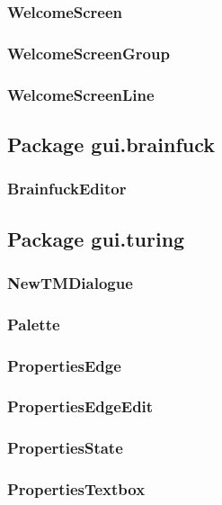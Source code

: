 \documentclass[%
  a4paper,%
  11pt,%
  blue,%
  hyperref	%
  ]{tubsartcl}
\begin{document}
\subsubsection{WelcomeScreen}

\subsubsection{WelcomeScreenGroup}

\subsubsection{WelcomeScreenLine}

\subsection{Package gui.brainfuck}

\subsubsection{BrainfuckEditor}


\subsection{Package gui.turing}

\subsubsection{NewTMDialogue}

\subsubsection{Palette}

\subsubsection{PropertiesEdge}

\subsubsection{PropertiesEdgeEdit}

\subsubsection{PropertiesState}

\subsubsection{PropertiesTextbox}
\end{document}
